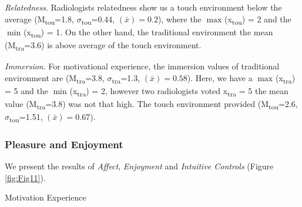 \documentclass[sigchi-a, authorversion]{acmart}
\begin{document}
\textit{Relatedness}. Radiologists relatedness show us a touch environment below the average (M\textsubscript{tou}=1.8, $\sigma$\textsubscript{tou}=0.44, {}$\left({\bar x}\right)=0.2$), where the $\max_{}$(x\textsubscript{tou}) = 2 and the $\min_{}$(x\textsubscript{tou}) = 1.  On the other hand, the traditional environment the mean (M\textsubscript{tra}=3.6) is above average of the touch environment.

\textit{Immersion}. For motivational experience, the immersion values of traditional environment are (M\textsubscript{tra}=3.8, $\sigma$\textsubscript{tra}=1.3, {}$\left({\bar x}\right)=0.58$). Here, we have a $\max_{}$(x\textsubscript{tra}) = 5 and the $\min_{}$(x\textsubscript{tra}) = 2, however two radiologists voted x\textsubscript{tra} = 5 the mean value (M\textsubscript{tra}=3.8) was not that high. The touch environment provided (M\textsubscript{tou}=2.6, $\sigma$\textsubscript{tou}=1.51, {}$\left({\bar x}\right)=0.67$).

\subsubsection{Pleasure and Enjoyment}

We present the results of \textit{Affect}, \textit{Enjoyment} and \textit{Intuitive Controls} (Figure \ref{fig:Fig11}).

\begin{margintable}
\caption{Motivation Experience}
\label{fig:Fig10}
\end{margintable}
\end{document}
